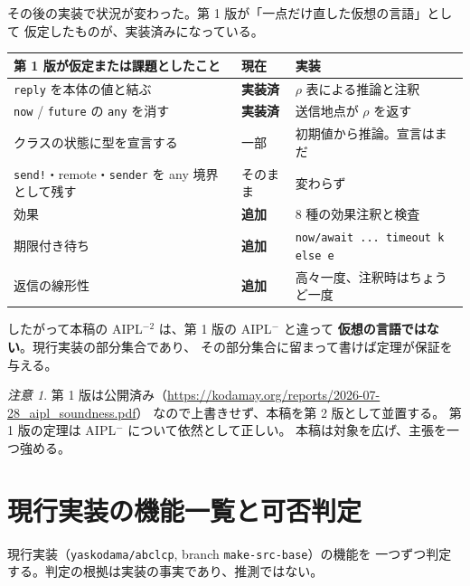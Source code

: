 \documentclass[11pt,a4paper]{ltjsarticle}
\theoremstyle{definition}
\theoremstyle{remark}
\newtheorem{remark}[theorem]{注意}
\begin{document}
その後の実装で状況が変わった。第 1 版が「一点だけ直した仮想の言語」として
仮定したものが、実装済みになっている。

\begin{center}
\small
\begin{tabular}{@{}lll@{}}
\toprule
第 1 版が仮定または課題としたこと & 現在 & 実装 \\
\midrule
\texttt{reply} を本体の値と結ぶ & \textbf{実装済} & $\rho$ 表による推論と注釈 \\
\texttt{now} / \texttt{future} の \texttt{any} を消す & \textbf{実装済} & 送信地点が $\rho$ を返す \\
クラスの状態に型を宣言する & 一部 & 初期値から推論。宣言はまだ \\
\texttt{send!}・remote・\texttt{sender} を any 境界として残す & そのまま & 変わらず \\
効果 & \textbf{追加} & 8 種の効果注釈と検査 \\
期限付き待ち & \textbf{追加} & \texttt{now/await ... timeout k else e} \\
返信の線形性 & \textbf{追加} & 高々一度、注釈時はちょうど一度 \\
\bottomrule
\end{tabular}
\end{center}

したがって本稿の AIPL$^{-2}$ は、第 1 版の AIPL$^-$ と違って
\textbf{仮想の言語ではない}。現行実装の部分集合であり、
その部分集合に留まって書けば定理が保証を与える。

\begin{remark}
第 1 版は公開済み（\url{https://kodamay.org/reports/2026-07-28_aipl_soundness.pdf}）
なので上書きせず、本稿を第 2 版として並置する。
第 1 版の定理は AIPL$^-$ について依然として正しい。
本稿は対象を広げ、主張を一つ強める。
\end{remark}

\section{現行実装の機能一覧と可否判定}

現行実装（\texttt{yaskodama/abclcp}, branch \texttt{make-src-base}）の機能を
一つずつ判定する。判定の根拠は実装の事実であり、推測ではない。
\end{document}
